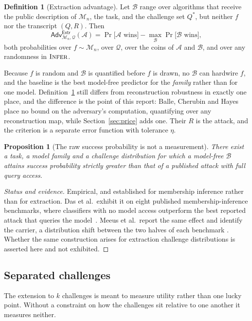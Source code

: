 \documentclass[11pt]{article}
\theoremstyle{definition}
\newtheorem{definition}{Definition}
\theoremstyle{plain}
\newtheorem{proposition}{Proposition}
\newcommand{\Adv}{\mathsf{Adv}}
\newcommand{\A}{\mathcal{A}}
\newcommand{\B}{\mathcal{B}}
\newcommand{\Q}{\mathcal{Q}}
\newcommand{\M}{\mathcal{M}}
\newcommand{\INFER}{\textsc{Infer}}
\begin{document}
\begin{definition}[Extraction advantage]
\label{def:adv}
Let $\B$ range over algorithms that receive the public description of $\M_n$, the
task, and the challenge set $Q^*$, but neither $f$ nor the transcript $(Q,R)$. Then
\[
\Adv^{\mathsf{Extr}}_{\M_n,\Q}(\A)
= \Pr\big[\A \text{ wins}\big] - \max_{\B} \Pr\big[\B \text{ wins}\big],
\]
both probabilities over $f \sim \M_n$, over $\Q$, over the coins of $\A$ and $\B$,
and over any randomness in $\INFER$.
\end{definition}

Because $f$ is random and $\B$ is quantified before $f$ is drawn, no $\B$ can
hardwire $f$, and the baseline is the best model-free predictor for the
\emph{family} rather than for one model. Definition~\ref{def:adv} still differs
from reconstruction robustness in exactly one place, and the difference is the
point of this report: Balle, Cherubin and Hayes place no bound on the adversary's
computation, quantifying over any reconstruction map, while
Section~\ref{sec:price} adds one. Their $R$ is the attack, and the criterion is a
separate error function with tolerance $\eta$.

\begin{proposition}[The raw success probability is not a measurement]
\label{prop:baseline}
There exist a task, a model family and a challenge distribution for which a
model-free $\B$ attains success probability strictly greater than that of a
published attack with full query access.
\end{proposition}

\begin{proof}[Status and evidence]
Empirical, and established for membership inference rather than for extraction.
Das et al.\ exhibit it on eight published membership-inference benchmarks, where
classifiers with no model access outperform the best reported attack that queries
the model~\cite{DZT25}. Meeus et al.\ report the same effect and identify the
carrier, a distribution shift between the two halves of each benchmark
\cite{MSJFRM25}. Whether the same construction arises for extraction challenge
distributions is asserted here and not exhibited.
\end{proof}

\subsection{Separated challenges}

The extension to $k$ challenges is meant to measure utility rather than one lucky
point. Without a constraint on how the challenges sit relative to one another it
measures neither.
\end{document}
